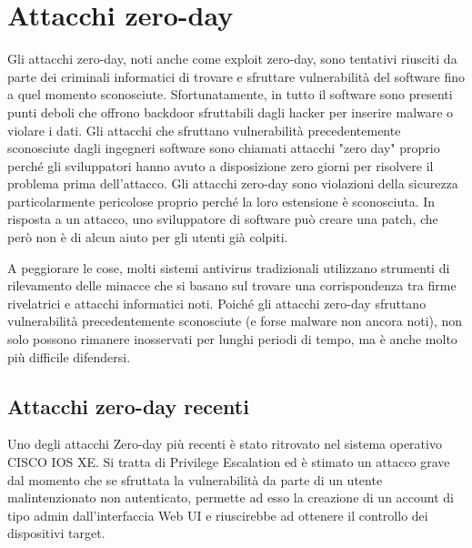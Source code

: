 \section{Attacchi zero-day}
\cite{attaccoZeroDay}
Gli attacchi zero-day, noti anche come exploit zero-day, sono tentativi riusciti da parte dei criminali informatici di trovare e sfruttare vulnerabilità del software fino a quel momento sconosciute. Sfortunatamente, in tutto il software sono presenti punti deboli che offrono backdoor sfruttabili dagli hacker per inserire malware o violare i dati. Gli attacchi che sfruttano vulnerabilità precedentemente sconosciute dagli ingegneri software sono chiamati attacchi "zero day" proprio perché gli sviluppatori hanno avuto a disposizione zero giorni per risolvere il problema prima dell'attacco.
Gli attacchi zero-day sono violazioni della sicurezza particolarmente pericolose proprio perché la loro estensione è sconosciuta. In risposta a un attacco, uno sviluppatore di software può creare una patch, che però non è di alcun aiuto per gli utenti già colpiti.

A peggiorare le cose, molti sistemi antivirus tradizionali utilizzano strumenti di rilevamento delle minacce che si basano sul trovare una corrispondenza tra firme rivelatrici e attacchi informatici noti. Poiché gli attacchi zero-day sfruttano vulnerabilità precedentemente sconosciute (e forse malware non ancora noti), non solo possono rimanere inosservati per lunghi periodi di tempo, ma è anche molto più difficile difendersi.
\subsection{Attacchi zero-day recenti}
\cite{attaccoZeroDayRecente}
Uno degli attacchi Zero-day più recenti è stato ritrovato nel sistema operativo CISCO IOS XE. Si tratta di Privilege Escalation ed è stimato un attacco grave dal momento che se sfruttata la vulnerabilità da parte di un utente malintenzionato non autenticato, permette ad esso la creazione di un account di tipo admin dall’interfaccia Web UI e riuscirebbe ad ottenere il controllo dei dispositivi target.
